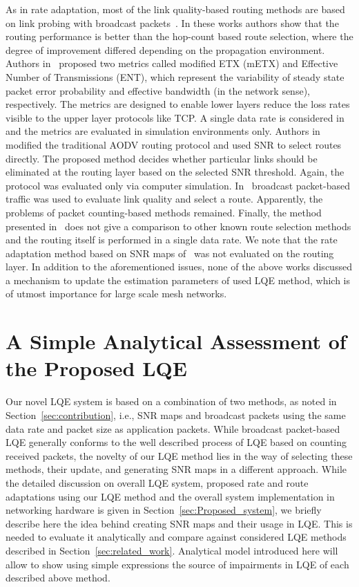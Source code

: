\documentclass[11pt,draftclsnofoot,journal,onecolumn]{IEEEtran}
\begin{document}
As in rate adaptation, most of the link quality-based routing methods are based on link probing with broadcast packets~\cite{Couto_WN_2005,BicketMobicom2005}. In these works authors show that the routing performance is better than the hop-count based route selection, where the degree of improvement differed depending on the propagation environment. Authors in~\cite{koksal_2006_JSAC} proposed two metrics called modified ETX (mETX) and Effective Number of Transmissions (ENT), which represent the variability of steady state packet error probability and effective bandwidth (in the network sense), respectively. The metrics are designed to enable lower layers reduce the loss rates visible to the upper layer protocols like TCP. A single data rate is considered in~\cite{koksal_2006_JSAC} and the metrics are evaluated in simulation environments only. Authors in~\cite{tsai_2006_wpc} modified the traditional AODV routing protocol and used SNR to select routes directly. The proposed method decides whether particular links should be eliminated at the routing layer based on the selected SNR threshold. Again, the protocol was evaluated only via computer simulation. In~\cite{karbaschi_2008_wowmom} broadcast packet-based traffic was used to evaluate link quality and select a route. Apparently, the problems of packet counting-based methods remained. Finally, the method presented in~\cite{wang_2006_realman} does not give a comparison to other known route selection methods and the routing itself is performed in a single data rate. We note that the rate adaptation method based on SNR maps of~\cite{Zhang_Infocom_2008} was not evaluated on the routing layer. In addition to the aforementioned issues, none of the above works discussed a mechanism to update the estimation parameters of used LQE method, which is of utmost importance for large scale mesh networks.

\section{A Simple Analytical Assessment of the Proposed LQE}
\label{sec:comparison}

Our novel LQE system is based on a combination of two methods, as noted in Section~\ref{sec:contribution}, i.e., SNR maps and broadcast packets using the same data rate and packet size as application packets. While broadcast packet-based LQE generally conforms to the well described process of LQE based on counting received packets, the novelty of our LQE method lies in the way of selecting these methods, their update, and generating SNR maps in a different approach. While the detailed discussion on overall LQE system, proposed rate and route adaptations using our LQE method and the overall system implementation in networking hardware is given in Section~\ref{sec:Proposed_system}, we  briefly describe here the idea behind creating SNR maps and their usage in LQE. This is needed to evaluate it analytically and compare against considered LQE methods described in Section~\ref{sec:related_work}. Analytical model introduced here will allow to show using simple expressions the source of impairments in LQE of each described above method.
\end{document}
